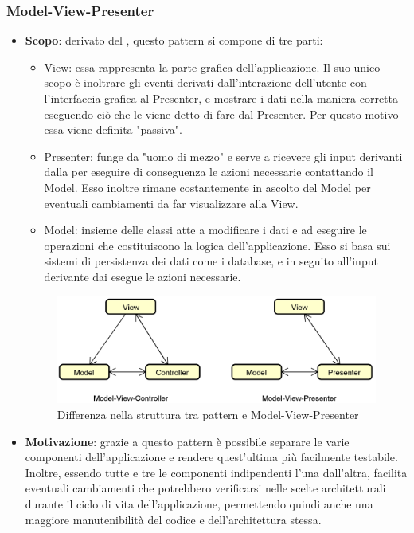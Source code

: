 \subsubsection{Model-View-Presenter}
\begin{itemize}
	\item \textbf{Scopo}: derivato del , questo pattern si compone di tre parti:
		  \begin{itemize}
		    	\item View: essa rappresenta la parte grafica dell'applicazione. Il suo unico scopo è inoltrare gli eventi derivati dall'interazione dell'utente con l'interfaccia grafica al Presenter, e mostrare i dati nella maniera corretta eseguendo ciò che le viene detto di fare dal Presenter. Per questo motivo essa viene definita "passiva".
		    	\item Presenter: funge da "uomo di mezzo" e serve a ricevere gli input derivanti dalla  per eseguire di conseguenza le azioni necessarie contattando il Model. Esso inoltre rimane costantemente in ascolto del Model per eventuali cambiamenti da far visualizzare alla View.
		    	\item Model: insieme delle classi atte a modificare i dati e ad eseguire le operazioni che costituiscono la logica dell'applicazione. Esso si basa sui sistemi di persistenza dei dati come i database, e in seguito all'input derivante dai  esegue le azioni necessarie.
		  \end{itemize}	
		  \begin{figure}[H]
		  \centering
		  \includegraphics[scale=0.45]{Sezioni/DesignPatterns/ModelViewControllerEModelViewPresenter.png}
		  \caption{Differenza nella struttura tra pattern  e Model-View-Presenter}
		  \end{figure}	   
	\item \textbf{Motivazione}: grazie a questo pattern è possibile separare le varie componenti dell'applicazione e rendere quest'ultima più facilmente testabile. Inoltre, essendo tutte e tre le componenti indipendenti l'una dall'altra, facilita eventuali cambiamenti che potrebbero verificarsi nelle scelte architetturali durante il ciclo di vita dell'applicazione, permettendo quindi anche una maggiore manutenibilità del codice e dell'architettura stessa.

\end{itemize}
